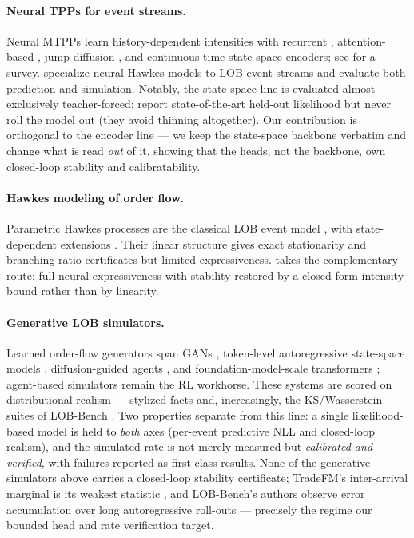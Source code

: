 \paragraph{Neural TPPs for event streams.}
Neural MTPPs learn history-dependent intensities with recurrent
\citep{du2016recurrent,Mei2017TheProcess}, attention-based
\citep{zhang2020self,zuo2020thp}, jump-diffusion \citep{zhang2024njdtpp}, and
continuous-time state-space \citep{chang2025ctssm} encoders; see
\citet{Shchur2021NeuralReview} for a survey. \citet{Shi2022StateSimulation}
specialize neural Hawkes models to LOB event streams and evaluate both prediction
and simulation. Notably, the state-space line is evaluated almost exclusively
teacher-forced: \citet{chang2025ctssm} report state-of-the-art held-out likelihood
but never roll the model out (they avoid thinning altogether). Our contribution is
orthogonal to the encoder line --- we keep the state-space backbone verbatim and
change what is read \emph{out} of it, showing that the heads, not the backbone, own
closed-loop stability and calibratability.

\paragraph{Hawkes modeling of order flow.}
Parametric Hawkes processes are the classical LOB event model
\citep{Hawkes1971,Hawkes2018HawkesReview,Jain2024LimitProcess,jain2024review}, with
state-dependent extensions \citep{Morariu-Patrichi2022State-dependentModelling}.
Their linear structure gives exact stationarity and branching-ratio certificates but
limited expressiveness. \ssppp{} takes the complementary route: full neural
expressiveness with stability restored by a closed-form intensity bound rather than
by linearity.

\paragraph{Generative LOB simulators.}
Learned order-flow generators span GANs \citep{li2020stockgan,coletta2021lobgan,
coletta2022worldagent}, token-level autoregressive state-space models
\citep{nagy2023lobs5}, diffusion-guided agents \citep{huang2026diga}, and
foundation-model-scale transformers \citep{mars2025,sood2026tradefm}; agent-based
simulators \citep{byrd2020abides,frey2023jaxlob} remain the RL workhorse. These
systems are scored on distributional realism --- stylized facts
\citep{cont2001empirical,vyetrenko2020getreal} and, increasingly, the KS/Wasserstein
suites of LOB-Bench \citep{nagy2025lobbench}. Two properties separate \ssppp{} from
this line: a single likelihood-based model is held to \emph{both} axes (per-event
predictive NLL and closed-loop realism), and the simulated rate is not merely
measured but \emph{calibrated and verified}, with failures reported as first-class
results. None of the generative simulators above carries a closed-loop stability
certificate; TradeFM's inter-arrival marginal is its weakest statistic
\citep{sood2026tradefm}, and LOB-Bench's authors observe error accumulation over long
autoregressive roll-outs \citep{nagy2025lobbench} --- precisely the regime our
bounded head and rate verification target.

